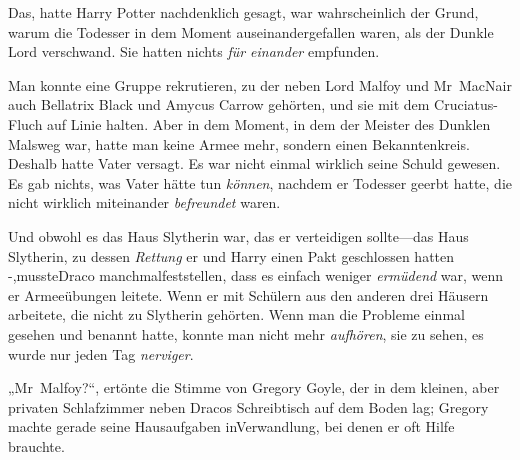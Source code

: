 Das, hatte Harry Potter nachdenklich gesagt, war wahrscheinlich der Grund, warum die Todesser in dem Moment auseinandergefallen waren, als der Dunkle Lord verschwand. Sie hatten nichts \emph{für einander} empfunden.

Man konnte eine Gruppe rekrutieren, zu der neben Lord Malfoy und Mr~MacNair auch Bellatrix Black und Amycus Carrow gehörten, und sie mit dem Cruciatus-Fluch auf Linie halten. Aber in dem Moment, in dem der Meister des Dunklen Malsweg war, hatte man keine Armee mehr, sondern einen Bekanntenkreis. Deshalb hatte Vater versagt. Es war nicht einmal wirklich seine Schuld gewesen. Es gab nichts, was Vater hätte tun \emph{können}, nachdem er Todesser geerbt hatte, die nicht wirklich miteinander \emph{befreundet} waren.

Und obwohl es das Haus Slytherin war, das er verteidigen sollte—das Haus Slytherin, zu dessen \emph{Rettung} er und Harry einen Pakt geschlossen hatten -,mussteDraco manchmalfeststellen, dass es einfach weniger \emph{ermüdend} war, wenn er Armeeübungen leitete. Wenn er mit Schülern aus den anderen drei Häusern arbeitete, die nicht zu Slytherin gehörten. Wenn man die Probleme einmal gesehen und benannt hatte, konnte man nicht mehr \emph{aufhören}, sie zu sehen, es wurde nur jeden Tag \emph{nerviger}.

„Mr~Malfoy?“, ertönte die Stimme von Gregory Goyle, der in dem kleinen, aber privaten Schlafzimmer neben Dracos Schreibtisch auf dem Boden lag; Gregory machte gerade seine Hausaufgaben inVerwandlung, bei denen er oft Hilfe brauchte.

